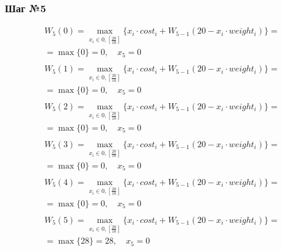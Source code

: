\documentclass[17pt]{extarticle}
\begin{document}
\subsubsection*{Шаг №5}
\[
    \begin{aligned}
         & W_5(0)=\max_{x_i \in \overline{0, \left[\frac{20}{10}\right]}} \{x_i \cdot cost_i + W_{5-1}(20 - x_i \cdot weight_i)\}= \\& = \max \{
        0\}= 0, \quad x_5 = 0                                                                                                      \\
    \end{aligned}
\]
\[
    \begin{aligned}
         & W_5(1)=\max_{x_i \in \overline{0, \left[\frac{20}{10}\right]}} \{x_i \cdot cost_i + W_{5-1}(20 - x_i \cdot weight_i)\}= \\& = \max \{
        0\}= 0, \quad x_5 = 0                                                                                                      \\
    \end{aligned}
\]
\[
    \begin{aligned}
         & W_5(2)=\max_{x_i \in \overline{0, \left[\frac{20}{10}\right]}} \{x_i \cdot cost_i + W_{5-1}(20 - x_i \cdot weight_i)\}= \\& = \max \{
        0\}= 0, \quad x_5 = 0                                                                                                      \\
    \end{aligned}
\]
\[
    \begin{aligned}
         & W_5(3)=\max_{x_i \in \overline{0, \left[\frac{20}{10}\right]}} \{x_i \cdot cost_i + W_{5-1}(20 - x_i \cdot weight_i)\}= \\& = \max \{
        0\}= 0, \quad x_5 = 0                                                                                                      \\
    \end{aligned}
\]
\[
    \begin{aligned}
         & W_5(4)=\max_{x_i \in \overline{0, \left[\frac{20}{10}\right]}} \{x_i \cdot cost_i + W_{5-1}(20 - x_i \cdot weight_i)\}= \\& = \max \{
        0\}= 0, \quad x_5 = 0                                                                                                      \\
    \end{aligned}
\]
\[
    \begin{aligned}
         & W_5(5)=\max_{x_i \in \overline{0, \left[\frac{20}{10}\right]}} \{x_i \cdot cost_i + W_{5-1}(20 - x_i \cdot weight_i)\}= \\& = \max \{
        28\}= 28, \quad x_5 = 0                                                                                                    \\
    \end{aligned}
\]
\end{document}
